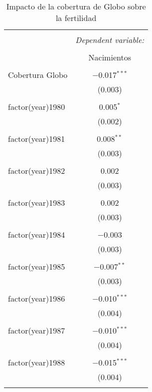 
\begin{table}[!htbp] \centering 
  \caption{Impacto de la cobertura de Globo sobre la fertilidad} 
  \label{tab:globo_fertilidad} 
\begin{tabular}{@{\extracolsep{5pt}}lc} 
\\[-1.8ex]\hline 
\hline \\[-1.8ex] 
 & \multicolumn{1}{c}{\textit{Dependent variable:}} \\ 
\cline{2-2} 
\\[-1.8ex] & Nacimientos \\ 
\hline \\[-1.8ex] 
 Cobertura Globo & $-$0.017$^{***}$ \\ 
  & (0.003) \\ 
  & \\ 
 factor(year)1980 & 0.005$^{*}$ \\ 
  & (0.002) \\ 
  & \\ 
 factor(year)1981 & 0.008$^{**}$ \\ 
  & (0.003) \\ 
  & \\ 
 factor(year)1982 & 0.002 \\ 
  & (0.003) \\ 
  & \\ 
 factor(year)1983 & 0.002 \\ 
  & (0.003) \\ 
  & \\ 
 factor(year)1984 & $-$0.003 \\ 
  & (0.003) \\ 
  & \\ 
 factor(year)1985 & $-$0.007$^{**}$ \\ 
  & (0.003) \\ 
  & \\ 
 factor(year)1986 & $-$0.010$^{***}$ \\ 
  & (0.004) \\ 
  & \\ 
 factor(year)1987 & $-$0.010$^{***}$ \\ 
  & (0.004) \\ 
  & \\ 
 factor(year)1988 & $-$0.015$^{***}$ \\ 
  & (0.004) \\ 
  & \\ 

\end{tabular}
\end{table}
